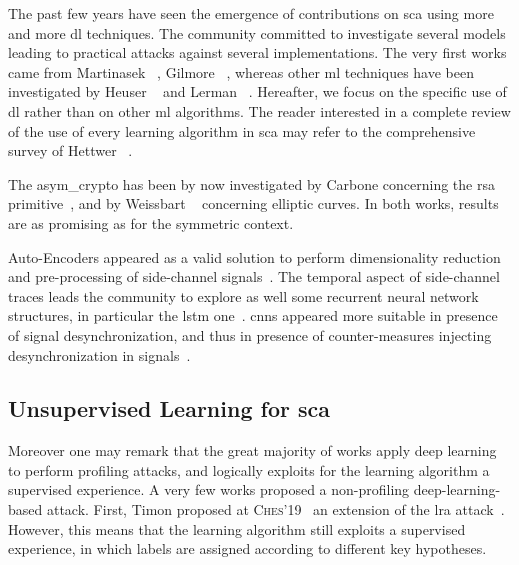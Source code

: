 The past few years have seen the emergence of contributions on \gls{sca} using more and more \gls{dl} techniques.
The community committed to investigate several models leading to practical attacks against several implementations. 
The very first works came from Martinasek \etal{}~\cite{martinasek_innovative_2013,martinasek_profiling_2016}, Gilmore \etal{}~\cite{gilmore_neural_2015}, whereas other \gls{ml} techniques have been investigated by Heuser \etal{}~\cite{heuser_intelligent_2012} and Lerman \etal~\cite{lerman_power_2014,lerman_machine_2015}.
Hereafter, we focus on the specific use of \gls{dl} rather than on other \gls{ml} algorithms.
The reader interested in a complete review of the use of every learning algorithm in \gls{sca} may refer to the comprehensive survey of Hettwer \etal{}~\cite{hettwer_applications_2020}.

The \gls{asym_crypto} has been by now investigated by Carbone \etal{} concerning the \gls{rsa} primitive~\cite{carbone_deep_2019}, and by Weissbart \etal{}~\cite{weissbart_one_2019} concerning elliptic curves.
In both works, results are as promising as for the symmetric context.

Auto-Encoders appeared as a valid solution to perform dimensionality reduction and pre-processing of side-channel signals~\cite{maghrebi_breaking_2016}. 
The temporal aspect of side-channel traces leads the community to explore as well some recurrent neural network structures, in particular the \gls{lstm} one~\cite{maghrebi_deep_2019}.
\glspl{cnn} appeared more suitable in presence of signal desynchronization, and thus in presence of counter-measures injecting desynchronization in signals~\cite{cagli_convolutional_2017,prouff_study_2018,kim_make_2019}.

\subsection{Unsupervised Learning for \gls{sca}}
Moreover one may remark that the great majority of works apply deep learning to perform profiling attacks, and logically exploits for the learning algorithm a supervised experience.
A very few works proposed a non-profiling deep-learning-based attack.
First, Timon proposed at \textsc{Ches}'19~\cite{timon_non-profiled_2019} an extension of the \gls{lra} attack~\cite{schindler_stochastic_2005}.
However, this means that the learning algorithm still exploits a supervised experience, in which labels are assigned according to different key hypotheses.

